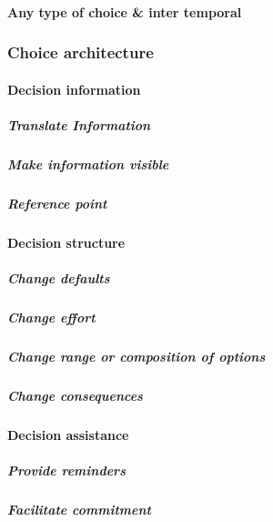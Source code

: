 \paragraph{Any type of choice \& inter temporal}

\subsubsection{Choice architecture}
\paragraph{Decision information}
\subparagraph{Translate Information}
\subparagraph{Make information visible}
\subparagraph{Reference point}
\paragraph{Decision structure}
\subparagraph{Change defaults}
\subparagraph{Change effort}
\subparagraph{Change range or composition of options}
\subparagraph{Change consequences}
\paragraph{Decision assistance}
\subparagraph{Provide reminders}
\subparagraph{Facilitate commitment}






